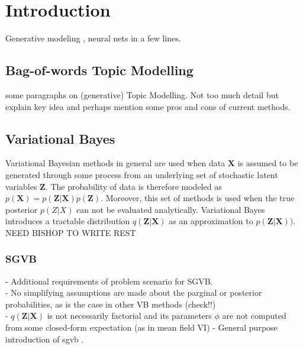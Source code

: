 \documentclass{report}
\begin{document}
\tableofcontents

\doublespacing
\chapter{Introduction}

Generative modeling , neural nets in a few lines.


\section{Bag-of-words Topic Modelling}
some paragraphs on (generative) Topic Modelling. 
Not too much detail but explain key idea and perhaps mention some pros and cons of current methods. 

\section{Variational Bayes}

Variational Bayesian methods in general are used when data $\mathbf{X}$ is assumed to be generated through some process from an underlying set of stochastic latent variables $\mathbf{Z}$. The probability of data is therefore modeled as $p(\mathbf{X}) = p(\mathbf{Z}|\mathbf{X})p(\mathbf{Z})$. Moreover, this set of methods is used when the true posterior $p(Z|X)$ can not be evaluated analytically. Variational Bayes introduces a tractable distribution $q(\mathbf{\mathbf{Z}|\mathbf{X}})$ as an approximation to $p(\mathbf{Z}|\mathbf{X}))$.
\\
NEED BISHOP TO WRITE REST

\subsection{SGVB}

- Additional requirements of problem scenario for SGVB. \\

- No simplifying assumptions are made about the parginal or posterior probabilities, as is the case in other VB methods (check!!) \\
- $q(\mathbf{Z}|\mathbf{X})$ is not necessarily factorial and its parameters $\phi$ are not computed from some closed-form expectation (as in mean field VI)
- General purpose introduction of sgvb . \\
\end{document}
